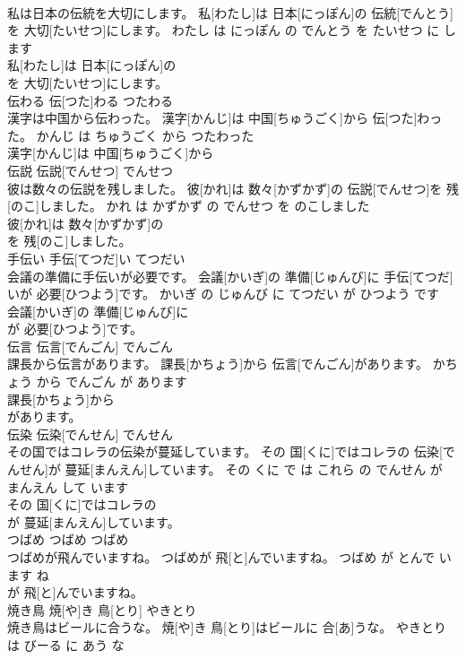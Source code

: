 \documentclass[8pt]{extreport}
\begin{document}
\begin{CJK}{UTF8}{min}
\\	私は日本の伝統を大切にします。	私[わたし]は 日本[にっぽん]の 伝統[でんとう]を 大切[たいせつ]にします。	わたし は にっぽん の でんとう を たいせつ に します	
\\	私[わたし]は 日本[にっぽん]の
\\	を 大切[たいせつ]にします。			
\\	伝わる	伝[つた]わる	つたわる	
\\	漢字は中国から伝わった。	漢字[かんじ]は 中国[ちゅうごく]から 伝[つた]わった。	かんじ は ちゅうごく から つたわった	
\\	漢字[かんじ]は 中国[ちゅうごく]から
\\	伝説	伝説[でんせつ]	でんせつ	
\\	彼は数々の伝説を残しました。	彼[かれ]は 数々[かずかず]の 伝説[でんせつ]を 残[のこ]しました。	かれ は かずかず の でんせつ を のこしました	
\\	彼[かれ]は 数々[かずかず]の
\\	を 残[のこ]しました。			
\\	手伝い	手伝[てつだ]い	てつだい	
\\	会議の準備に手伝いが必要です。	会議[かいぎ]の 準備[じゅんび]に 手伝[てつだ]いが 必要[ひつよう]です。	かいぎ の じゅんび に てつだい が ひつよう です	
\\	会議[かいぎ]の 準備[じゅんび]に
\\	が 必要[ひつよう]です。			
\\	伝言	伝言[でんごん]	でんごん	
\\	課長から伝言があります。	課長[かちょう]から 伝言[でんごん]があります。	かちょう から でんごん が あります	
\\	課長[かちょう]から
\\	があります。			
\\	伝染	伝染[でんせん]	でんせん	
\\	その国ではコレラの伝染が蔓延しています。	その 国[くに]ではコレラの 伝染[でんせん]が 蔓延[まんえん]しています。	その くに で は これら の でんせん が まんえん して います	
\\	その 国[くに]ではコレラの
\\	が 蔓延[まんえん]しています。			
\\	つばめ	つばめ	つばめ	
\\	つばめが飛んでいますね。	つばめが 飛[と]んでいますね。	つばめ が とんで います ね	
\\	が 飛[と]んでいますね。			
\\	焼き鳥	焼[や]き 鳥[とり]	やきとり	
\\	焼き鳥はビールに合うな。	焼[や]き 鳥[とり]はビールに 合[あ]うな。	やきとり は びーる に あう な	

\end{CJK}
\end{document}
